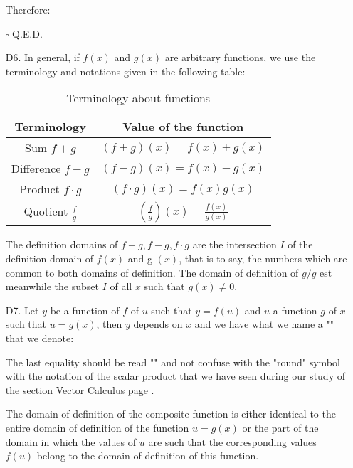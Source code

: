 \begin{enumerate}
\begin{dem}
		Therefore:
		
		\begin{flushright}
			$\square$  Q.E.D.
		\end{flushright}
		\end{dem}
		\item[D6.] In general, if $f (x)$ and $g (x)$ are arbitrary functions, we use the terminology and notations given in the following table:
		\begin{table}[H]	
			\begin{center}
				\begin{tabular}{|c|c|}
				\hline
				  \rowcolor[gray]{0.75}Terminology&Value of the function\\
				  \hline
				  Sum $f+g$ & $(f+g)(x)=f(x)+g(x)$ \\\hline
				  Difference $f-g$ & $(f-g)(x)=f(x)-g(x)$ \\\hline
				  Product $f \cdot g$ & $(f \cdot g)(x)=f(x)g(x)$ \\\hline
				  Quotient $\displaystyle\frac{f}{g}$&$\left(\displaystyle\frac{f}{g}\right)(x)=\displaystyle\frac{f(x)}{g(x)}$ \\\hline
				\end{tabular}
			\end{center}
			\caption{Terminology about functions}
		\end{table}
		The definition domains of $f+g,f-g,f\cdot g$ are the intersection $I$ of the definition domain of $f (x)$ and g $(x)$, that is to say, the numbers which are common to both domains of definition. The domain of definition of $g/g$ est meanwhile the subset $I$ of all $x$ such that  $g(x)\neq 0$.
		
		\item[D7.] Let $y$ be a function of $f$ of $u$ such that $y=f(u)$ and $u$ a function $g$ of $x$ such that $u=g(x)$, then $y$ depends on $x$ and we have what we name a "" that we denote:
		
		The last equality should be read "" and not confuse with the "round" symbol with the notation of the scalar product that we have seen during our study of the section Vector Calculus page \pageref{dot product}.
		
		The domain of definition of the composite function is either identical to the entire domain of definition of the function $u=g(x)$ or the part of the domain in which the values of $u$ are such that the corresponding values $f (u)$ belong to the domain of definition of this function.
		

\end{enumerate}
